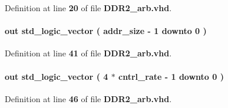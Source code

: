 Definition at line {\bf 20} of file {\bf D\+D\+R2\+\_\+arb.\+vhd}.

\paragraph[{local\+\_\+addr}]{ {\bfseries \textcolor{keywordflow}{out}\textcolor{vhdlchar}{ }} {\bfseries \textcolor{comment}{std\+\_\+logic\+\_\+vector}\textcolor{vhdlchar}{ }\textcolor{vhdlchar}{(}\textcolor{vhdlchar}{ }\textcolor{vhdlchar}{ }\textcolor{vhdlchar}{ }\textcolor{vhdlchar}{ }{\bfseries {\bf addr\+\_\+size}} \textcolor{vhdlchar}{-\/}\textcolor{vhdlchar}{ } \textcolor{vhdldigit}{1} \textcolor{vhdlchar}{ }\textcolor{keywordflow}{downto}\textcolor{vhdlchar}{ }\textcolor{vhdlchar}{ } \textcolor{vhdldigit}{0} \textcolor{vhdlchar}{ }\textcolor{vhdlchar}{)}\textcolor{vhdlchar}{ }} \hspace{0.3cm}{\ttfamily [Port]}}\label{classDDR2__arb_aa3fac40e636fea66dc5eb49f338ddf43}


Definition at line {\bf 41} of file {\bf D\+D\+R2\+\_\+arb.\+vhd}.

\paragraph[{local\+\_\+be}]{ {\bfseries \textcolor{keywordflow}{out}\textcolor{vhdlchar}{ }} {\bfseries \textcolor{comment}{std\+\_\+logic\+\_\+vector}\textcolor{vhdlchar}{ }\textcolor{vhdlchar}{(}\textcolor{vhdlchar}{ }\textcolor{vhdlchar}{ } \textcolor{vhdldigit}{4} \textcolor{vhdlchar}{$\ast$}\textcolor{vhdlchar}{ }\textcolor{vhdlchar}{ }\textcolor{vhdlchar}{ }{\bfseries {\bf cntrl\+\_\+rate}} \textcolor{vhdlchar}{-\/}\textcolor{vhdlchar}{ } \textcolor{vhdldigit}{1} \textcolor{vhdlchar}{ }\textcolor{keywordflow}{downto}\textcolor{vhdlchar}{ }\textcolor{vhdlchar}{ } \textcolor{vhdldigit}{0} \textcolor{vhdlchar}{ }\textcolor{vhdlchar}{)}\textcolor{vhdlchar}{ }} \hspace{0.3cm}{\ttfamily [Port]}}\label{classDDR2__arb_aa0f4404b42d26d0c417c86d17bbb8416}


Definition at line {\bf 46} of file {\bf D\+D\+R2\+\_\+arb.\+vhd}.

